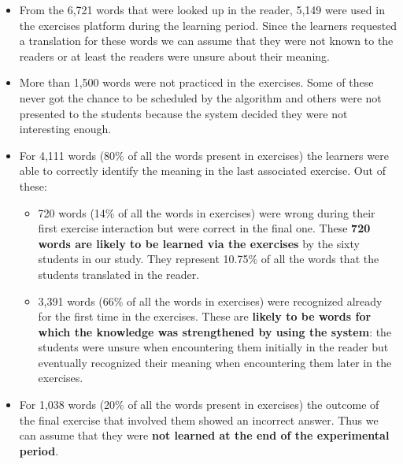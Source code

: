   \begin{itemize}
    \item From the 6,721 words that were looked up in the reader, 5,149 were used in the exercises platform during the learning period. Since the learners requested a translation for these words we can assume that they were not known to the readers or at least the readers were unsure about their meaning. 

    \item More than 1,500 words were not practiced in the exercises. Some of these never got the chance to be scheduled by the algorithm and others were not presented to the students because the system decided they were not interesting enough. 

    \item For 4,111 words (80\% of all the words present in exercises) the learners were able to correctly identify the meaning in the last associated exercise. Out of these: 

    \begin{itemize}
      \item 720 words (14\% of all the words in exercises) were wrong during their first exercise interaction but were correct in the final one. These {\bf 720 words are likely to be learned via the exercises} by the sixty students in our study. They represent 10.75\% of all the words that the students translated in the reader.

      \item 3,391 words (66\% of all the words in exercises) were recognized already for the first time in the exercises. These are {\bf likely to be words for which the knowledge was strengthened by using the system}: the students were unsure when encountering them initially in the reader but eventually recognized their meaning when encountering them later in the exercises. 
    \end{itemize}

  \item For 1,038 words (20\% of all the words present in exercises) the outcome of the final exercise that involved them showed an incorrect answer. Thus we can assume that they were {\bf not learned at the end of the experimental period}.

  \end{itemize}















